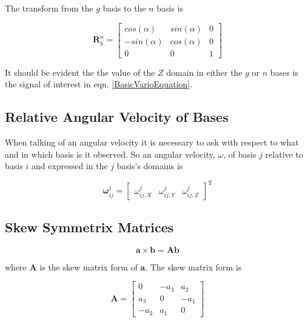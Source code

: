 \documentclass[a4paper]{report}
\numberwithin{equation}{chapter}
\newcommand{\mat}[1]{\boldsymbol{#1}}
\begin{document}
\bigskip

The transform from the $g$ basis to the $n$ basis is

\begin{equation}
\mat{R}^n_g =
\begin{bmatrix}
cos \left( \alpha \right) & sin \left( \alpha \right) & 0 \\
-sin \left( \alpha \right) & cos \left( \alpha \right) & 0 \\
0 & 0 & 1
\end{bmatrix}
\end{equation}

\bigskip

It should be evident the the value of the $Z$ domain in either the $g$ or $n$ bases is the signal of interest in eqn. \ref{BasicVarioEquation}.

\subsection[Relative Angular Velocity of Bases]{Relative Angular Velocity of Bases}

When talking of an angular velocity it is necessary to ask with respect to what and in which basis is it observed. So an angular velocity, $\omega$, of basis $j$ relative to basis $i$ and expressed in the $j$ basis's domains is

\begin{equation}
\mat{\omega}^j_{ij} =
\begin{bmatrix}
\omega^j_{ij,X} & \omega^j_{ij,Y} & \omega^j_{ij,Z}
\end{bmatrix} ^{\mathrm{T}}
\end{equation}

\subsection[Skew Symmetrix Matrices]{Skew Symmetrix Matrices}

\begin{equation}
\mat{a} \times \mat{b} = \mat{A} \mat{b}
\end{equation}

where $\mat{A}$ is the skew matrix form of $\mat{a}$. The skew matrix form is

\begin{equation}
\mat{A} =
\begin {bmatrix}
0 & -a_3 & a_2 \\
a_3 & 0 & -a_1 \\
-a_2 & a_1 & 0
\end{bmatrix}
\end{equation}
\end{document}

